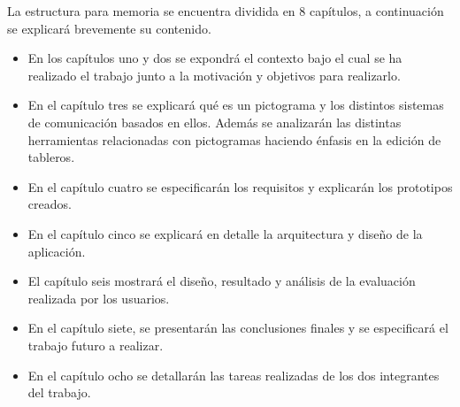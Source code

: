 La estructura para memoria se encuentra dividida en 8 capítulos, a continuación se explicará brevemente su contenido. 
\begin{itemize}
	\item En los capítulos uno y dos se expondrá el contexto bajo el cual se ha realizado el trabajo junto a la motivación y objetivos para realizarlo.
	
	\item En el capítulo tres se explicará qué es un pictograma y los distintos sistemas de comunicación basados en ellos. Además se analizarán las distintas herramientas relacionadas con pictogramas haciendo énfasis en la edición de tableros.
	
	\item En el capítulo cuatro se especificarán los requisitos y explicarán los prototipos creados.
	
	\item En el capítulo cinco se explicará en detalle la arquitectura y diseño de la aplicación.
	
	\item El capítulo seis mostrará el diseño, resultado y análisis de la evaluación realizada por los usuarios. 
	
	\item En el capítulo siete, se presentarán las conclusiones finales y se especificará el trabajo futuro a realizar.
	
	\item En el capítulo ocho se detallarán las tareas realizadas de los dos integrantes del trabajo.
\end{itemize}	




